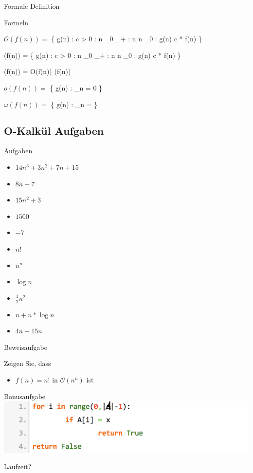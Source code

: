 \documentclass[18pt]{beamer}
\begin{document}
	\begin{frame}{Formale Definition}
				
		\begin{block} {Formeln}	
				\item $\mathcal{O}(f(n)) = $ \{ g(n) : \exists c >  0 : \exists  n _{0} \in {} _{+} : \all n \geq n _{0} : g(n) \leq c * f(n) \} \\
				\item \Omega(f(n)) = \{ g(n) : \exists c >  0 : \exists  n _{0} \in {} _{+} : \all n \geq n _{0} : g(n) \leq c * f(n) \}\\

				\item \Theta(f(n)) = O(f(n))   \cap   \Omega(f(n))
			
				\item $o(f(n)) = $ \{ g(n) : \lim _{n \to \infty}  = 0 \}

				\item $\omega(f(n)) = $ \{ g(n) : \lim _{n \to \infty}  = \infty \}

							
		\end{block}	

	\end{frame}

	\subsection{O-Kalkül Aufgaben}

	\begin{frame}{Aufgaben}
		\begin{itemize}
			\item $ 14 n ^{3} + 3 n ^{2}  + 7n + 15$
			\item $ 8 n + 7 $
			\item $ 15 n ^{2} + 3 $
			\item $ 1500 $
			\item $ -7 $
			\item $ n! $
			\item $ n ^{n} $
			\item $ \log{n} $
			\item $ \frac{1}{2} n ^{2} $
			\item $ n + n * \log{n} $
			\item $ 4 n + 15 n $	
		\end{itemize}	
	\end{frame}

	\begin{frame}{Beweisaufgabe}
		\begin{exampleblock}{Zeigen Sie, dass}
			\begin{itemize}
				\item $ f(n) =  n! $ in $ \mathcal{O} ( n ^{n}) $ ist
			\end{itemize}
		\end{exampleblock}
	\end{frame}


	\begin{frame}{Bonusaufgabe}
		\includegraphics[align=center, scale=0.25]{pics/pseudocode02.png}
		


		Laufzeit?	
	\end{frame}
\end{document}
